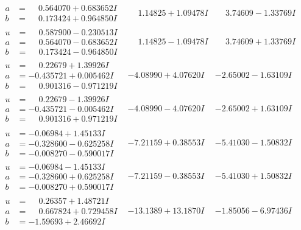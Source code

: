\documentclass[1p]{elsarticle_modified}
\theoremstyle{definition}
\begin{document}
$$\begin{array}{c|c|c}
\begin{aligned}
a &= \phantom{-}0.564070 + 0.683652 I \\
b &= \phantom{-}0.173424 + 0.964850 I\end{aligned}
 & \phantom{-}1.14825 + 1.09478 I & \phantom{-}3.74609 - 1.33769 I \\ \hline\begin{aligned}
u &= \phantom{-}0.587900 - 0.230513 I \\
a &= \phantom{-}0.564070 - 0.683652 I \\
b &= \phantom{-}0.173424 - 0.964850 I\end{aligned}
 & \phantom{-}1.14825 - 1.09478 I & \phantom{-}3.74609 + 1.33769 I \\ \hline\begin{aligned}
u &= \phantom{-}0.22679 + 1.39926 I \\
a &= -0.435721 + 0.005462 I \\
b &= \phantom{-}0.901316 - 0.971219 I\end{aligned}
 & -4.08990 + 4.07620 I & -2.65002 - 1.63109 I \\ \hline\begin{aligned}
u &= \phantom{-}0.22679 - 1.39926 I \\
a &= -0.435721 - 0.005462 I \\
b &= \phantom{-}0.901316 + 0.971219 I\end{aligned}
 & -4.08990 - 4.07620 I & -2.65002 + 1.63109 I \\ \hline\begin{aligned}
u &= -0.06984 + 1.45133 I \\
a &= -0.328600 - 0.625258 I \\
b &= -0.008270 - 0.590017 I\end{aligned}
 & -7.21159 + 0.38553 I & -5.41030 - 1.50832 I \\ \hline\begin{aligned}
u &= -0.06984 - 1.45133 I \\
a &= -0.328600 + 0.625258 I \\
b &= -0.008270 + 0.590017 I\end{aligned}
 & -7.21159 - 0.38553 I & -5.41030 + 1.50832 I \\ \hline\begin{aligned}
u &= \phantom{-}0.26357 + 1.48721 I \\
a &= \phantom{-}0.667824 + 0.729458 I \\
b &= -1.59693 + 2.46692 I\end{aligned}
 & -13.1389 + 13.1870 I & -1.85056 - 6.97436 I \\ \hline\begin{aligned}

\end{aligned}
\end{array}$$
\end{document}
